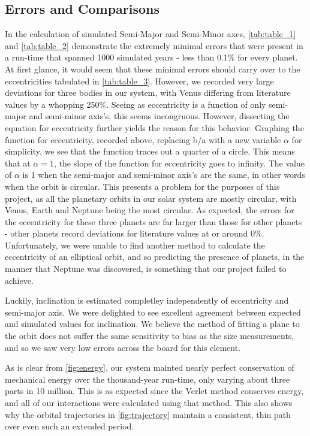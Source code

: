 \documentclass[a4paper,12pt]{article} %
\numberwithin{equation}{section} %
\numberwithin{figure}{section} %
\begin{document}
\subsection{Errors and Comparisons}
\label{sec:errors}

In the calculation of simulated Semi-Major and Semi-Minor axes, \autoref{tab:table_1} and \autoref{tab:table_2} demonstrate the extremely minimal errors that were present in a run-time that spanned 1000 simulated years - less than 0.1\% for every planet. At first glance, it would seem that these minimal errors should carry over to the eccentricities tabulated in \autoref{tab:table_3}. However, we recorded very large deviations for three bodies in our system, with Venus differing from literature values by a whopping 250\%. Seeing as eccentricity is a function of only semi-major and semi-minor axis's, this seems incongruous. However, dissecting the equation for eccentricity further yields the reason for this behavior. Graphing the function for eccentricity, recorded above, replacing b/a with a new variable $\alpha$ for simplicity, we see that the function traces out a quarter of a circle. This means that at $\alpha = 1$, the slope of the function for eccentricity goes to infinity. The value of $\alpha$ is $1$ when the semi-major and semi-minor axis's are the same, in other words when the orbit is circular. This presents a problem for the purposes of this project, as all the planetary orbits in our solar system are mostly circular, with Venus, Earth and Neptune being the most circular. As expected, the errors for the eccentricity for these three planets are far larger than those for other planets - other planets record deviations for literature values at or around $0\%$. Unfortunately, we were unable to find another method to calculate the eccentricity of an elliptical orbit, and so predicting the presence of planets, in the manner that Neptune was discovered, is something that our project failed to achieve. \par
Luckily, inclination is estimated completley independently of eccentricity and semi-major axis. We were delighted to see excellent agreement between expected and simulated values for inclination. We believe the method of fitting a plane to the orbit does not suffer the same sensitivity to bias as the size measurements, and so we saw very low errors across the board for this element. \par
As is clear from \autoref{fig:energy}, our system mainted nearly perfect conservation of mechanical energy over the thousand-year run-time, only varying about three parts in 10 million. This is as expected since the Verlet method conserves energy, and all of our interactions were calculated using that method. This also shows why the orbital trajectories in \autoref{fig:trajectory} maintain a consistent, thin path over even such an extended period.
\end{document}
